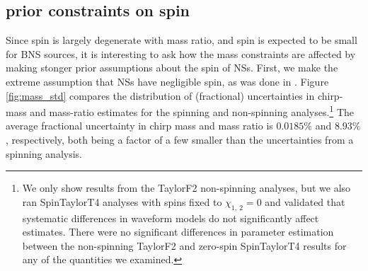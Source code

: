 \subsection{prior constraints on spin}
\label{subsec:prior_constraints}

Since spin is largely degenerate with mass ratio, and spin is expected to be small for BNS sources, it is interesting to ask how the mass constraints are affected by making stonger prior assumptions about the spin of NSs.  First, we make the extreme assumption that NSs have negligible spin, as was done in \citet{Singer_2014}.  Figure \ref{fig:mass_std} compares the distribution of (fractional) uncertainties in chirp-mass and mass-ratio estimates for the spinning and non-spinning analyses.\footnote{We only show results from the TaylorF2 non-spinning analyses, but we also ran SpinTaylorT4 analyses with spins fixed to $\chi_{1,~2}=0$ and validated that systematic differences in waveform models do not significantly affect estimates. There were no significant differences in parameter estimation between the non-spinning TaylorF2 and zero-spin SpinTaylorT4 results for any of the quantities we examined.} The average fractional uncertainty in chirp mass and mass ratio is $0.0185\%$ and $8.93\%$, respectively, both being a factor of a few smaller than the uncertainties from a spinning analysis.
  
  
  
  